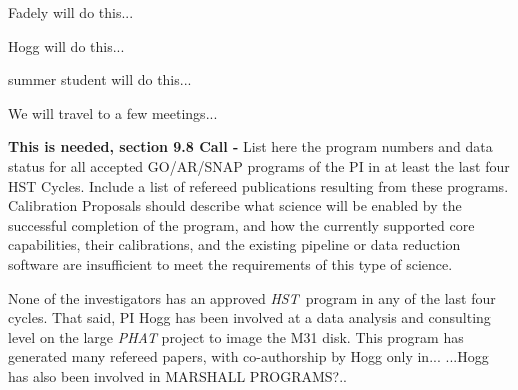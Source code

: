 \documentclass[12pt]{article}
\newcommand{\project}[1]{\textsl{#1}}
\newcommand{\HST}{\project{HST}}
\begin{document}
Fadely will do this...

Hogg will do this...

summer student will do this...

We will travel to a few meetings...


%
%
%
\pasthstusage  %

\textbf{This is needed, section 9.8 Call -} List here the program 
numbers and data status for all accepted GO/AR/SNAP programs of the 
PI in at least the last four HST Cycles. Include a list of refereed 
publications resulting from these programs. Calibration Proposals 
should describe what science will be enabled by the successful 
completion of the program, and how the currently supported core 
capabilities, their calibrations, and the existing pipeline or data
reduction software are insufficient to meet the requirements of this 
type of science.


None of the investigators has an approved \HST\ program in any of the
last four cycles.  That said, PI Hogg has been involved at a data
analysis and consulting level on the large \project{PHAT} project to
image the M31 disk.  This program has generated many refereed papers,
with co-authorship by Hogg only in...  ...Hogg has also been involved
in MARSHALL PROGRAMS?..



\end{document}
